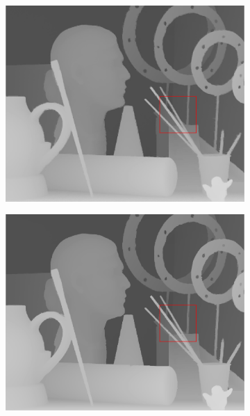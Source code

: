 \documentclass[preprint,10pt,5p,times,twocolumn]{elsarticle}
\begin{document}
\begin{figure}[t]
\begin{center}
\begin{subfigure}[b]{0.136\linewidth}
    \includegraphics[width=\linewidth]{cmp_art_8X_ST.png}
    \label{fig:}
\end{subfigure}
\begin{subfigure}[b]{0.136\linewidth}
    \includegraphics[width=\linewidth]{cmp_art_8X_LF.png}
    \label{fig:} %
\end{subfigure}
\begin{subfigure}[b]{0.136\linewidth}

\end{subfigure}
\end{center}
\end{figure}
\end{document}
